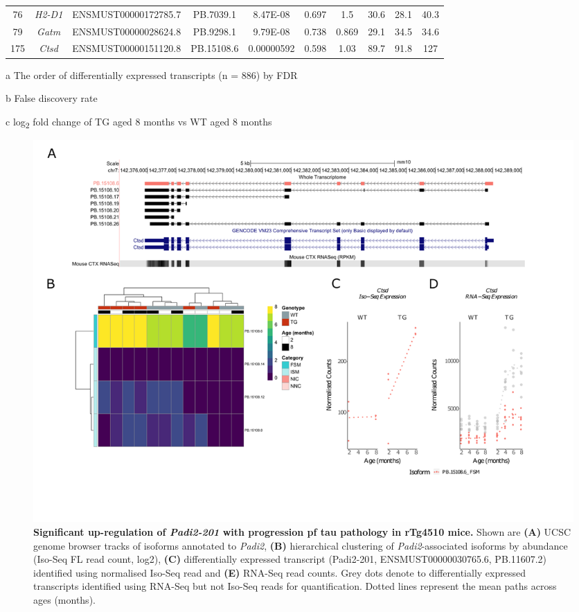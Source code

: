 \begin{landscape}
\begin{table}[]
\begin{threeparttable}
\begin{tabular}{@{}cccccccccc@{}}
		76  & \textit{H2-D1}  & ENSMUST00000172785.7  & PB.7039.1  & 8.47E-08   & 0.697 & 1.5   & 30.6  & 28.1  & 40.3  \\
		79  & \textit{Gatm}   & ENSMUST00000028624.8  & PB.9298.1  & 9.79E-08   & 0.738 & 0.869 & 29.1  & 34.5  & 34.6  \\
		175 & \textit{Ctsd}   & ENSMUST00000151120.8  & PB.15108.6 & 0.00000592 & 0.598 & 1.03  & 89.7  & 91.8  & 127   \\ \bottomrule
	\end{tabular}
	\begin{tablenotes}
		\footnotesize
		\item[a] The order of differentially expressed transcripts (n = 886) by FDR
		\item[b] False discovery rate
		\item[c] log\textsubscript{2} fold change of TG aged 8 months vs WT aged 8 months
	\end{tablenotes}
	\end{threeparttable}
	\label{tab:DEI_trans}
\end{table}
\end{landscape}

\begin{landscape}
	\begin{figure}[!htp]
		\centering
		\includegraphics[page=4,trim={1.5cm 3.5cm 2cm 1cm}, scale = 0.85]{Figures/Ch5_DiffPlots_Landscape.pdf}
		\captionsetup{width=1.5\textwidth}
		\caption[Differential \textit{Padi2} transcript expression]%
		{\textbf{Significant up-regulation of \textit{Padi2-201} with progression pf tau pathology in rTg4510 mice.} Shown are \textbf{(A)} UCSC genome browser tracks of isoforms annotated to \textit{Padi2}, \textbf{(B)} hierarchical clustering of \textit{Padi2}-associated isoforms by abundance (Iso-Seq FL read count, log2), \textbf{(C)} differentially expressed transcript (Padi2-201, ENSMUST00000030765.6, PB.11607.2) identified using normalised Iso-Seq read and \textbf{(E)} RNA-Seq read counts. Grey dots denote to differentially expressed transcripts identified using RNA-Seq but not Iso-Seq reads for quantification. Dotted lines represent the mean paths across ages (months).}   
		\label{fig:Padi2}
	\end{figure}	
\end{landscape}

